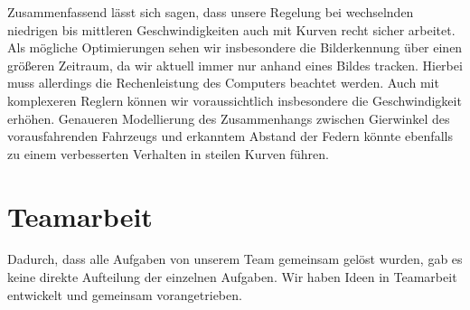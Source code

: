 \documentclass[10pt]{article}
\begin{document}
    Zusammenfassend lässt sich sagen, dass unsere Regelung bei wechselnden niedrigen bis mittleren Geschwindigkeiten auch mit Kurven recht sicher arbeitet.
    Als mögliche Optimierungen sehen wir insbesondere die Bilderkennung über einen größeren Zeitraum, da wir aktuell immer nur anhand eines Bildes tracken.
    Hierbei muss allerdings die Rechenleistung des Computers beachtet werden.
    Auch mit komplexeren Reglern können wir voraussichtlich insbesondere die Geschwindigkeit erhöhen.
    Genaueren Modellierung des Zusammenhangs zwischen Gierwinkel des vorausfahrenden Fahrzeugs und erkanntem Abstand der Federn könnte ebenfalls zu einem verbesserten Verhalten in steilen Kurven führen.

\section{Teamarbeit}
    Dadurch, dass alle Aufgaben von unserem Team gemeinsam gelöst wurden, gab es keine direkte Aufteilung der einzelnen Aufgaben.
    Wir haben Ideen in Teamarbeit entwickelt und gemeinsam vorangetrieben.
\end{document}
